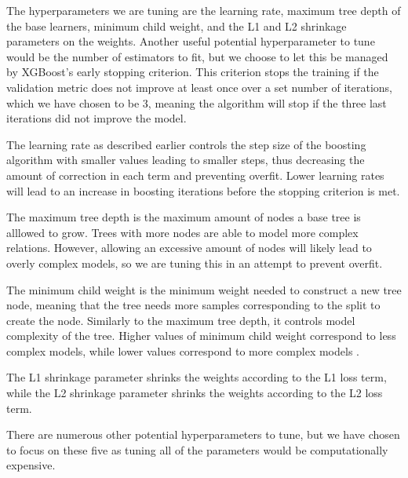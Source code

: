 \documentclass[a4paper, 11pt, twocolumn]{article}
\begin{document}
The hyperparameters we are tuning are the learning rate, maximum tree depth of 
the base learners, minimum child weight, and the L1 and L2 shrinkage parameters 
on the weights. Another useful potential hyperparameter to tune would be the 
number of estimators to fit, but we choose to let this be managed by XGBoost's 
early stopping criterion. This criterion stops the training if the validation 
metric does not improve at least once over a set number of iterations, which we 
have chosen to be 3, meaning the algorithm will stop if the three last iterations did 
not improve the model. 

The learning rate as described earlier controls the step size of the boosting 
algorithm with smaller values leading to smaller steps, thus decreasing the 
amount of correction in each term and preventing overfit. Lower learning rates 
will lead to an increase in boosting iterations before the stopping criterion is 
met. 

The maximum tree depth is the maximum amount of nodes a base tree is alllowed to 
grow. Trees with more nodes are able to model more complex relations. However, 
allowing an excessive amount of nodes will likely lead to overly complex models, 
so we are tuning this in an attempt to prevent overfit. 

The minimum child weight is the minimum weight needed to construct a new tree 
node, meaning that the tree needs more samples corresponding to the split to 
create the node. Similarly to the maximum tree depth, it controls model 
complexity of the tree. Higher values of minimum child weight correspond to less 
complex models, while lower values correspond to more complex models 
\cite{xgboost_tuning}.

The L1 shrinkage parameter shrinks the weights according to the L1 loss term, 
while the L2 shrinkage parameter shrinks the weights according to the L2 loss 
term. 

There are numerous other potential hyperparameters to tune, but we have chosen 
to focus on these five as tuning all of the parameters would be computationally 
expensive. 
\end{document}
